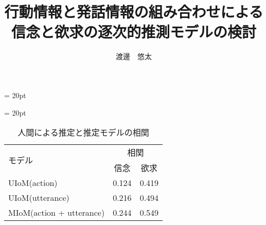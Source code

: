\documentclass[12pt]{jreport}
\title{行動情報と発話情報の組み合わせによる\\信念と欲求の逐次的推測モデルの検討}
\author{渡邊　悠太}                   %
\date{}
\begin{document}
\baselineskip = 20pt

\nocite{*}
\maketitle                  %

\newpage

\setcounter{page}{1}

\tableofcontents     %
\listoffigures       %
\listoftables        %
\newpage

\setcounter{page}{1}

\baselineskip = 20pt


\begin{table}[htb]
  \begin{center}
  \caption{人間による推定と推定モデルの相関}
  \begin{tabular}{l|c|c} \hline
    \multirow{2}{*}{モデル}&\multicolumn{2}{c}{相関}\\\cline{2-3}
    & \hspace{10pt} 信念 \hspace{10pt} & \hspace{10pt} 欲求 \hspace{10pt} \\ \hline
    UIoM(action)&0.124&0.419\\
    UIoM(utterance)&0.216&0.494\\
    MIoM(action + utterance)&0.244&0.549 \\\hline
  \end{tabular}
\end{center}
\end{table}











\end{document}
